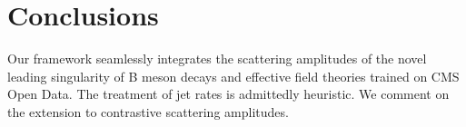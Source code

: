 \section{Conclusions}\label{sec:conclusions}

Our framework seamlessly integrates the scattering amplitudes of the
novel leading singularity of B meson decays and effective field theories
trained on CMS Open Data. The treatment of jet rates is admittedly
heuristic. We comment on the extension to contrastive scattering
amplitudes.

